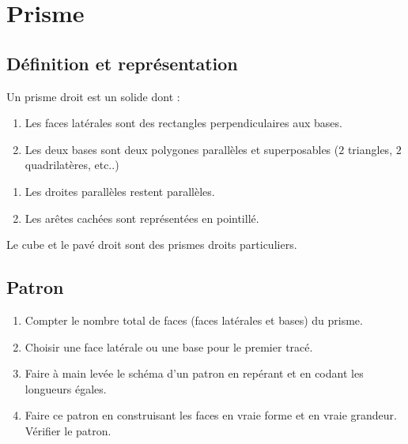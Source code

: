 \documentclass[a4paper,10pt]{report}
\begin{document}
\vspace{-3mm}
\section{Prisme}

\vspace{-3mm}
\subsection{Définition et représentation}

\vspace{-2mm}
\begin{defn}
Un prisme droit est un solide dont :
\begin{enumerate}
\item[•] Les faces latérales sont des rectangles perpendiculaires aux bases.
\item[•] Les deux bases sont deux polygones parallèles et superposables ($2$ triangles, $2$ quadrilatères, etc..)
\end{enumerate}
\end{defn}

\begin{memento}
\begin{enumerate}
\item[•] Les droites parallèles restent parallèles.
\item[•] Les arêtes cachées sont représentées en pointillé.
\end{enumerate}
\end{memento}

\begin{rem}

\vspace{-4.5mm} \hspace{2.8cm} Le cube et le pavé droit sont des prismes droits particuliers.
\end{rem}

\vspace{-3mm}
\subsection{Patron}

\vspace{-2mm}
\begin{meth}
\begin{enumerate}
\item Compter le nombre total de faces (faces latérales et bases) du prisme.
\item Choisir une face latérale ou une base pour le premier tracé.
\item Faire à main levée le schéma d'un patron en repérant et en codant les longueurs égales.
\item Faire ce patron en construisant les faces en vraie forme et en vraie grandeur. Vérifier le patron.
\end{enumerate}
\end{meth}
\end{document}
